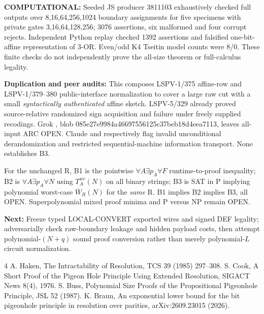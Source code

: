 \documentclass{article}
\begin{document}
\noindent\textbf{COMPUTATIONAL:} Seeded JS producer 3811103 exhaustively checked full outputs over 8,16,64,256,1024 boundary assignments for five specimens with private gates 3,16,64,128,256; 3076 assertions, six malformed and four corrupt rejects. Independent Python replay checked 1392 assertions and falsified one-bit-affine representation of 3-OR. Even/odd K4 Tseitin model counts were 8/0. These finite checks do not independently prove the all-size theorem or full-calculus legality.

\noindent\textbf{Duplication and peer audits:} This composes LSPV-1/375 affine-row and LSPV-1/379--380 public-interface normalization to cover a large raw cut with a small \emph{syntactically authenticated} affine sketch. LSPV-5/329 already proved source-relative randomized sign acquisition and failure under freely supplied recodings. Grok , blob 085e27e9984a46697556125c37beb18d4eea7113, leaves all-input ARC OPEN. Claude  and  respectively flag invalid unconditional derandomization and restricted sequential-machine information transport. None establishes B3.

\noindent For the unchanged R, B1 is the pointwise $\forall A\exists p_A\forall F$ runtime-to-proof inequality; B2 is $\forall A\exists p_A\forall N$ using $T_A^{wc}(N)$ on all binary strings; B3 is SAT in P implying polynomial worst-case $\overline W_R(N)$ for the \emph{same} R. B1 implies B2 implies B3, all OPEN. Superpolynomial mixed proof minima and P versus NP remain OPEN.

\noindent\textbf{Next:} Freeze typed LOCAL-CONVERT exported wires and signed DEF legality; adversarially check raw-boundary leakage and hidden payload costs, then attempt polynomial-$(N+q)$ sound proof conversion rather than merely polynomial-$L$ circuit normalization.

\begin{thebibliography}{4}
 A. Haken, The Intractability of Resolution, TCS 39 (1985) 297--308.
 S. Cook, A Short Proof of the Pigeon Hole Principle Using Extended Resolution, SIGACT News 8(4), 1976.
 S. Buss, Polynomial Size Proofs of the Propositional Pigeonhole Principle, JSL 52 (1987).
 K. Braun, An exponential lower bound for the bit pigeonhole principle in resolution over parities, arXiv:2609.23015 (2026).
\end{thebibliography}
\end{document}
